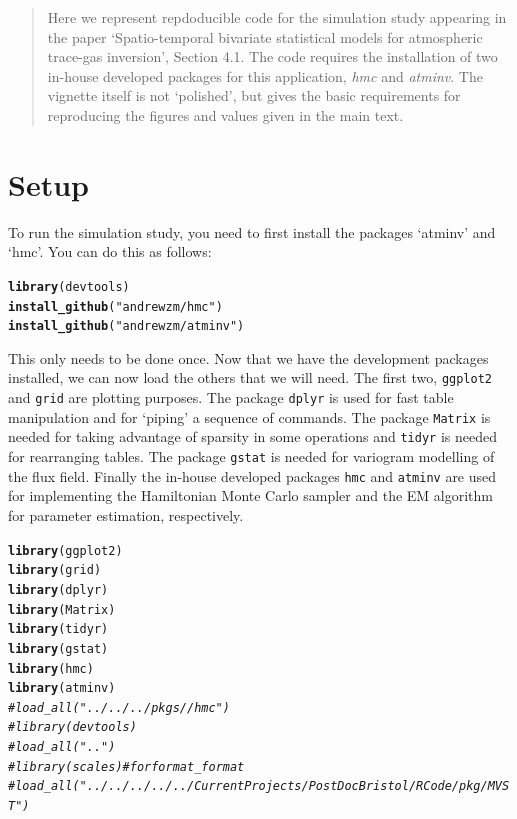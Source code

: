 \documentclass[a4paper,11pt]{article}\usepackage[]{graphicx}\usepackage[]{color}
\makeatletter
\newcommand{\hlstr}[1]{\textcolor[rgb]{0.192,0.494,0.8}{#1}}%
\newcommand{\hlcom}[1]{\textcolor[rgb]{0.678,0.584,0.686}{\textit{#1}}}%
\newcommand{\hlstd}[1]{\textcolor[rgb]{0.345,0.345,0.345}{#1}}%
\newcommand{\hlkwd}[1]{\textcolor[rgb]{0.737,0.353,0.396}{\textbf{#1}}}%
\newenvironment{kframe}{%
 \def\at@end@of@kframe{}%
 \ifinner\ifhmode%
  \def\at@end@of@kframe{\end{minipage}}%
  \begin{minipage}{\columnwidth}%
 \fi\fi%
 \def\FrameCommand##1{\hskip\@totalleftmargin \hskip-\fboxsep
 \colorbox{shadecolor}{##1}\hskip-\fboxsep
     \hskip-\linewidth \hskip-\@totalleftmargin \hskip\columnwidth}%
 \MakeFramed {\advance\hsize-\width
   \@totalleftmargin\z@ \linewidth\hsize
   \@setminipage}}%
 {\par\unskip\endMakeFramed%
 \at@end@of@kframe}
\newenvironment{knitrout}{}{} %
\makeatother
\begin{document}
\begin{abstract}
Here we represent repdoducible code for the simulation study appearing in the paper `Spatio-temporal bivariate statistical models for atmospheric trace-gas inversion', Section 4.1. The code requires the installation of two in-house developed packages for this application, \emph{hmc} and \emph{atminv}. The vignette itself is not `polished', but gives the basic requirements for reproducing the figures and values given in the main text.

\end{abstract}

\section{Setup}

To run the simulation study, you need to first install the packages `atminv' and `hmc'. You can do this as follows:

\begin{knitrout}
\color{fgcolor}\begin{kframe}
\begin{alltt}
\hlkwd{library}\hlstd{(devtools)}
\hlkwd{install_github}\hlstd{(}\hlstr{"andrewzm/hmc"}\hlstd{)}
\hlkwd{install_github}\hlstd{(}\hlstr{"andrewzm/atminv"}\hlstd{)}
\end{alltt}
\end{kframe}
\end{knitrout}

This only needs to be done once. Now that we have the development packages installed, we can now load the others that we will need. The first two, \texttt{ggplot2} and \texttt{grid} are plotting purposes. The package \texttt{dplyr} is used for fast table manipulation and for `piping' a sequence of commands. The package \texttt{Matrix} is needed for taking advantage of sparsity in some operations and \texttt{tidyr} is needed for rearranging tables. The package \texttt{gstat} is needed for variogram modelling of the flux field. Finally the in-house developed packages \texttt{hmc} and \texttt{atminv} are used for implementing the Hamiltonian Monte Carlo sampler and the EM algorithm for parameter estimation, respectively.

\begin{knitrout}
\color{fgcolor}\begin{kframe}
\begin{alltt}
\hlkwd{library}\hlstd{(ggplot2)}
\hlkwd{library}\hlstd{(grid)}
\hlkwd{library}\hlstd{(dplyr)}
\hlkwd{library}\hlstd{(Matrix)}
\hlkwd{library}\hlstd{(tidyr)}
\hlkwd{library}\hlstd{(gstat)}
\hlkwd{library}\hlstd{(hmc)}
\hlkwd{library}\hlstd{(atminv)}
\hlcom{# load_all("../../../pkgs//hmc")}
\hlcom{#library(devtools)}
\hlcom{#load_all("..")}
\hlcom{#library(scales) # for format_format}
\hlcom{#load_all("../../../../../CurrentProjects/PostDoc Bristol/R Code/pkg/MVST")}
\end{alltt}
\end{kframe}
\end{knitrout}
\end{document}
